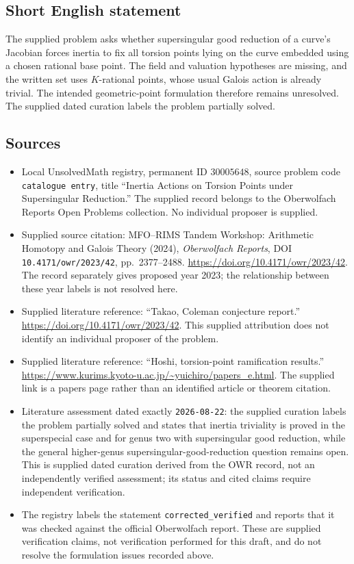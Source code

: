 \documentclass[11pt]{article}
\begin{document}
\subsection{Short English statement}
The supplied problem asks whether supersingular good reduction of a curve's Jacobian forces inertia to fix all torsion points lying on the curve embedded using a chosen rational base point. The field and valuation hypotheses are missing, and the written set uses \(K\)-rational points, whose usual Galois action is already trivial. The intended geometric-point formulation therefore remains unresolved. The supplied dated curation labels the problem partially solved.
\subsection{Sources}
\begin{itemize}
\item Local UnsolvedMath registry, permanent ID \(30005648\), source problem code \texttt{catalogue entry}, title ``Inertia Actions on Torsion Points under Supersingular Reduction.'' The supplied record belongs to the Oberwolfach Reports Open Problems collection. No individual proposer is supplied.
\item Supplied source citation: MFO--RIMS Tandem Workshop: Arithmetic Homotopy and Galois Theory (2024), \emph{Oberwolfach Reports}, DOI \texttt{10.4171/owr/2023/42}, pp.~2377--2488. \url{https://doi.org/10.4171/owr/2023/42}. The record separately gives proposed year 2023; the relationship between these year labels is not resolved here.
\item Supplied literature reference: ``Takao, Coleman conjecture report.'' \url{https://doi.org/10.4171/owr/2023/42}. This supplied attribution does not identify an individual proposer of the problem.
\item Supplied literature reference: ``Hoshi, torsion-point ramification results.'' \url{https://www.kurims.kyoto-u.ac.jp/~yuichiro/papers_e.html}. The supplied link is a papers page rather than an identified article or theorem citation.
\item Literature assessment dated exactly \texttt{2026-08-22}: the supplied curation labels the problem partially solved and states that inertia triviality is proved in the superspecial case and for genus two with supersingular good reduction, while the general higher-genus supersingular-good-reduction question remains open. This is supplied dated curation derived from the OWR record, not an independently verified assessment; its status and cited claims require independent verification.
\item The registry labels the statement \texttt{corrected\_verified} and reports that it was checked against the official Oberwolfach report. These are supplied verification claims, not verification performed for this draft, and do not resolve the formulation issues recorded above.
\end{itemize}
\end{document}
